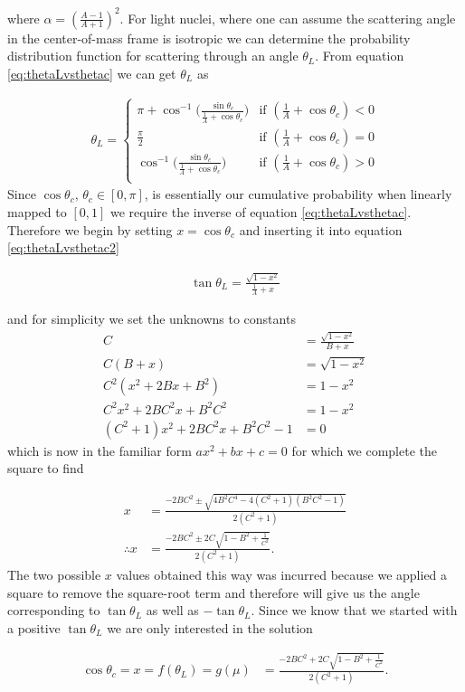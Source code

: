 \documentclass[11pt,letterpaper,titlepage]{article}
\newcommand{\beq}{\begin{equation*}
\begin{aligned}}
\newcommand{\eeq}{\end{aligned}
\end{equation*}}
\newcommand{\beqn}{\begin{equation}
	\begin{aligned}}
\newcommand{\eeqn}{\end{aligned}
	\end{equation}}
\numberwithin{equation}{section}
\begin{document}
\begin{appendices}
where $\alpha = ( \frac{A-1}{A+1})^2$. For light nuclei, where one can assume the scattering angle in the center-of-mass frame is isotropic \cite{Duderstadt} we can determine the probability distribution function for scattering through an angle $\theta_L$. From equation \ref{eq:thetaLvsthetac} we can get $\theta_L$ as 

\beqn \label{eq:thetaLvsthetac2} 
\theta_L = 
\begin{cases}
\pi + 
\cos^{-1} \biggr(
\frac{\sin \theta_c}{ \frac{1}{A} + \cos \theta_c      }
\biggr)
& \text{if } (\frac{1}{A} + \cos \theta_c) < 0 \\
\frac{\pi}{2} & \text{if } (\frac{1}{A} + \cos \theta_c) = 0 \\
\cos^{-1} \biggr(
\frac{\sin \theta_c}{ \frac{1}{A} + \cos \theta_c      }
\biggr)
& \text{if } (\frac{1}{A} + \cos \theta_c) > 0 \\
\end{cases}
\eeqn 
\newline
Since $\cos \theta_c$, $\theta_c \in [0,\pi]$, is essentially our cumulative probability when linearly mapped to $[0,1]$ we require the inverse of equation \ref{eq:thetaLvsthetac}. Therefore we begin by setting $x=\cos \theta_c$ and inserting it into equation \ref{eq:thetaLvsthetac2}

\beq 
\tan \theta_L = \frac{ \sqrt{1-x^2}      }{ \frac{1}{A} + x}
\eeq 

 and for simplicity we set the unknowns to constants
 \beq 
C &= \frac{ \sqrt{1-x^2}      }{ B + x} \\
C(B+x) &= \sqrt{1-x^2}  \\
C^2(x^2+2Bx + B^2) &= 1-x^2 \\
C^2x^2+2BC^2x + B^2C^2 &= 1 -x^2 \\
(C^2+1) x^2 +2BC^2 x + B^2C^2 -1 &= 0
 \eeq 
  which is now in the familiar form $ax^2 + bx +c =0$ for which we complete the square to find
  
 \beq
 x &= \frac{  -2BC^2   \pm \sqrt{  4B^2C^4 - 4(C^2+1)(B^2C^2-1)    }     }{2(C^2+1)}\\
 \therefore x&= \frac{  -2BC^2   \pm 2C\sqrt{  1-B^2+\frac{1}{C^2}   }     }{2(C^2+1)}.
 \eeq
The two possible $x$ values obtained this way was incurred because we applied a square to remove the square-root term and therefore will give us the angle corresponding to $\tan \theta_L$ as well as $-\tan \theta_L$. Since we know that we started with a positive $\tan \theta_L$ we are only interested in the solution

 \beqn
 \cos \theta_c =  x = f(\theta_L)=g(\mu) &= \frac{  -2BC^2  + 2C\sqrt{  1-B^2+\frac{1}{C^2}   }     }{2(C^2+1)} .
 \eeqn
 

\end{appendices}
\end{document}
